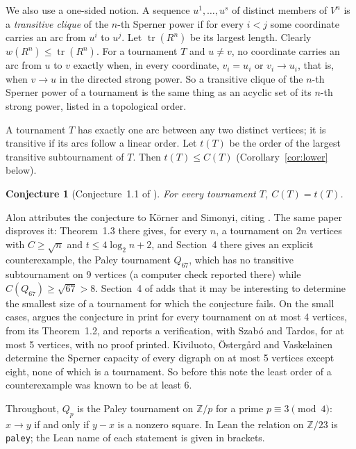 \documentclass[11pt]{article}
\newtheorem{conjecture}[theorem]{Conjecture}
\theoremstyle{definition}
\theoremstyle{remark}
\newcommand{\tr}{\operatorname{tr}}
\begin{document}
We also use a one-sided notion. A sequence $u^1, \dots, u^s$ of distinct members of $V^n$ is a
\emph{transitive clique} of the $n$-th Sperner power if for every $i < j$ some coordinate carries
an arc from $u^i$ to $u^j$. Let $\tr(R^n)$ be its largest length. Clearly $w(R^n) \le \tr(R^n)$.
For a tournament $T$ and $u \ne v$, no coordinate carries an arc from $u$ to $v$ exactly when, in
every coordinate, $v_i = u_i$ or $v_i \to u_i$, that is, when $v \to u$ in the directed strong
power. So a transitive clique of the $n$-th Sperner power of a tournament is the same thing as an
acyclic set of its $n$-th strong power, listed in a topological order.

A tournament $T$ has exactly one arc between any two distinct vertices; it is transitive if its
arcs follow a linear order. Let $t(T)$ be the order of the largest transitive subtournament of
$T$. Then $t(T) \le C(T)$ (Corollary~\ref{cor:lower} below).

\begin{conjecture}[Conjecture~1.1 of \cite{alon}]\label{conj}
For every tournament $T$, $C(T) = t(T)$.
\end{conjecture}

Alon attributes the conjecture to K\"orner and Simonyi, citing \cite{korner}. The same paper
disproves it: Theorem~1.3 there gives, for every $n$, a tournament on $2n$ vertices with
$C \ge \sqrt n$ and $t \le 4 \log_2 n + 2$, and Section~4 there gives an explicit counterexample, the
Paley tournament $Q_{67}$, which has no transitive subtournament on 9 vertices (a computer check
reported there) while $C(Q_{67}) \ge \sqrt{67} > 8$. Section~4 of \cite{alon} adds that it may be
interesting to determine the smallest size of a tournament for which the conjecture fails. On the
small cases, \cite{alon} argues the conjecture in print for every tournament on at most 4 vertices,
from its Theorem~1.2, and reports a verification, with Szab\'o and Tardos, for at most 5 vertices,
with no proof printed. Kiviluoto, \"Osterg\aa rd and Vaskelainen \cite{kov} determine the Sperner
capacity of every digraph on at most 5 vertices except eight, none of which is a tournament. So
before this note the least order of a counterexample was known to be at least 6.

Throughout, $Q_p$ is the Paley tournament on $\mathbb{Z}/p$ for a prime $p \equiv 3 \pmod 4$:
$x \to y$ if and only if $y - x$ is a nonzero square. In Lean the relation on $\mathbb{Z}/23$ is
\texttt{paley}; the Lean name of each statement is given in brackets.
\end{document}
